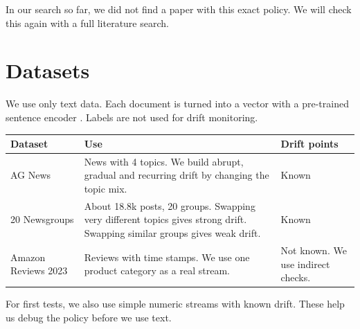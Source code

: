 \documentclass[11pt,a4paper]{article}
\begin{document}
In our search so far, we did not find a paper with this exact policy. We will check this again with a full literature search.

\section{Datasets}

We use only text data. Each document is turned into a vector with a pre-trained sentence encoder \cite{reimers2019}. Labels are not used for drift monitoring.

\begin{table}[h]
\centering
\small
\begin{tabular}{p{3.2cm}p{5.4cm}p{4.6cm}}
\toprule
Dataset & Use & Drift points \\
\midrule
AG News \cite{zhang2015} & News with 4 topics. We build abrupt, gradual and recurring drift by changing the topic mix. & Known \\
20 Newsgroups \cite{lang1995} & About 18.8k posts, 20 groups. Swapping very different topics gives strong drift. Swapping similar groups gives weak drift. & Known \\
Amazon Reviews 2023 \cite{amazon2023} & Reviews with time stamps. We use one product category as a real stream. & Not known. We use indirect checks. \\
\bottomrule
\end{tabular}
\end{table}

For first tests, we also use simple numeric streams with known drift. These help us debug the policy before we use text.
\end{document}
